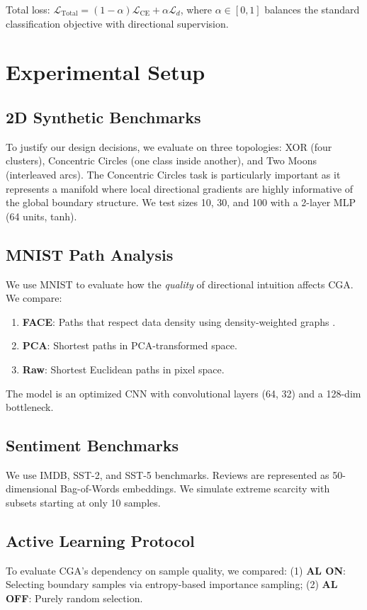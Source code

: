 \documentclass[sigconf,anonymous]{aamas}
\begin{document}
Total loss: $\mathcal{L}_{\text{Total}} = (1-\alpha)\mathcal{L}_{\textrm{CE}} + \alpha \mathcal{L}_{d}$, where $\alpha \in [0,1]$ balances the standard classification objective with directional supervision.

\section{Experimental Setup}
\label{sec:experimental_setup}

\subsection{2D Synthetic Benchmarks}
To justify our design decisions, we evaluate on three topologies: XOR (four clusters), Concentric Circles (one class inside another), and Two Moons (interleaved arcs). The Concentric Circles task is particularly important as it represents a manifold where local directional gradients are highly informative of the global boundary structure. We test sizes 10, 30, and 100 with a 2-layer MLP (64 units, tanh).

\subsection{MNIST Path Analysis}
We use MNIST to evaluate how the \emph{quality} of directional intuition affects CGA. We compare:
\begin{enumerate}
    \item \textbf{FACE}: Paths that respect data density using density-weighted graphs \cite{poyiadzi2020face}.
    \item \textbf{PCA}: Shortest paths in PCA-transformed space.
    \item \textbf{Raw}: Shortest Euclidean paths in pixel space.
\end{enumerate}
The model is an optimized CNN with convolutional layers (64, 32) and a 128-dim bottleneck.

\subsection{Sentiment Benchmarks}
We use IMDB, SST-2, and SST-5 benchmarks. Reviews are represented as 50-dimensional Bag-of-Words embeddings. We simulate extreme scarcity with subsets starting at only 10 samples.

\subsection{Active Learning Protocol}
To evaluate CGA's dependency on sample quality, we compared: (1) \textbf{AL ON}: Selecting boundary samples via entropy-based importance sampling; (2) \textbf{AL OFF}: Purely random selection.
\end{document}

